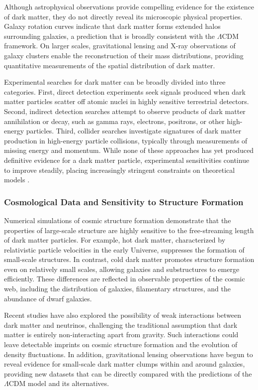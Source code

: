 Although astrophysical observations provide compelling evidence for the existence of dark matter, they do not directly reveal its microscopic physical properties. Galaxy rotation curves indicate that dark matter forms extended halos surrounding galaxies, a prediction that is broadly consistent with the $\Lambda$CDM framework. On larger scales, gravitational lensing and X-ray observations of galaxy clusters enable the reconstruction of their mass distributions, providing quantitative measurements of the spatial distribution of dark matter.

Experimental searches for dark matter can be broadly divided into three categories. First, direct detection experiments seek signals produced when dark matter particles scatter off atomic nuclei in highly sensitive terrestrial detectors. Second, indirect detection searches attempt to observe products of dark matter annihilation or decay, such as gamma rays, electrons, positrons, or other high-energy particles. Third, collider searches investigate signatures of dark matter production in high-energy particle collisions, typically through measurements of missing energy and momentum. While none of these approaches has yet produced definitive evidence for a dark matter particle, experimental sensitivities continue to improve steadily, placing increasingly stringent constraints on theoretical models \cite{billard2022}.

\subsubsection{Cosmological Data and Sensitivity to Structure Formation}

Numerical simulations of cosmic structure formation demonstrate that the properties of large-scale structure are highly sensitive to the free-streaming length of dark matter particles. For example, hot dark matter, characterized by relativistic particle velocities in the early Universe, suppresses the formation of small-scale structures. In contrast, cold dark matter promotes structure formation even on relatively small scales, allowing galaxies and substructures to emerge efficiently. These differences are reflected in observable properties of the cosmic web, including the distribution of galaxies, filamentary structures, and the abundance of dwarf galaxies.

Recent studies have also explored the possibility of weak interactions between dark matter and neutrinos, challenging the traditional assumption that dark matter is entirely non-interacting apart from gravity. Such interactions could leave detectable imprints on cosmic structure formation and the evolution of density fluctuations. In addition, gravitational lensing observations have begun to reveal evidence for small-scale dark matter clumps within and around galaxies, providing new datasets that can be directly compared with the predictions of the $\Lambda$CDM model and its alternatives.

